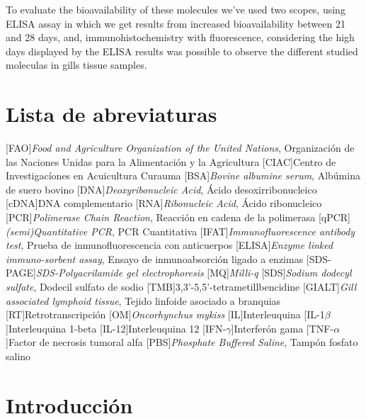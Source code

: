 \documentclass[12pt,letterpaper,oneside]{scrbook}
\begin{document}
To evaluate the bioavailability of these molecules we've used two
scopes, using ELISA assay in which we get results from increased
bioavailability between 21 and 28 days, and, immunohistochemistry with
fluorescence, considering the high days displayed by the ELISA results
was possible to observe the different studied moleculas in gills tissue
samples. \tableofcontents
\clearpage
\cleardoublepage
\chapter{Lista de abreviaturas}

\begin{acronym}
    [FAO]{\emph{Food and Agriculture Organization of the United Nations}, Organización de las Naciones Unidas para la Alimentación y la Agricultura}
    [CIAC]{Centro de Investigacíones en Acuicultura Curauma}
    [BSA]{\emph{Bovine albumine serum}, Albúmina de suero bovino}
    [DNA]{\emph{Deoxyribonucleic Acid}, Ácido desoxirribonucleico}
    [cDNA]{DNA complementario}
    [RNA]{\emph{Ribonucleic Acid}, Ácido ribonucleico}
    [PCR]{\emph{Polimerase Chain Reaction}, Reacción en cadena de la polimerasa}
    [qPCR]{\emph{(semi)Quantitative PCR}}, PCR Cuantitativa
    [IFAT]{\emph{Immunofluorescence antibody test}, Prueba de inmunofluorescencia con anticuerpos}
    [ELISA]{\emph{Enzyme linked immuno-sorbent assay}, Ensayo de inmunoabsorción ligado a enzimas}
    [SDS-PAGE]{\emph{SDS-Polyacrilamide gel electrophoresis}}
    [MQ]{\emph{Milli-q}}
    [SDS]{\emph{Sodium dodecyl sulfate}, Dodecil sulfato de sodio}
    [TMB]{3,3'-5,5'-tetrametillbencidine}
    [GIALT]{\emph{Gill associated lymphoid tissue}, Tejido linfoide asociado a branquias}
    [RT]{Retrotranscripción}
    [OM]{\emph{Oncorhynchus mykiss}}
    [IL]{Interleuquina}
    [IL-1$\beta$]{Interleuquina 1-beta}
    [IL-12]{Interleuquina 12}
    [IFN-$\gamma$]{Interferón gama}
    [TNF-$\alpha$]{Factor de necrosis tumoral alfa}
    [PBS]{\emph{Phosphate Buffered Saline}, Tampón fosfato salino}
    \end{acronym}

\clearpage
\listoffigures
\cleardoublepage
\listoftables

\mainmatter
\chapter{Introducción}\label{cap.introduccion}
\end{document}
